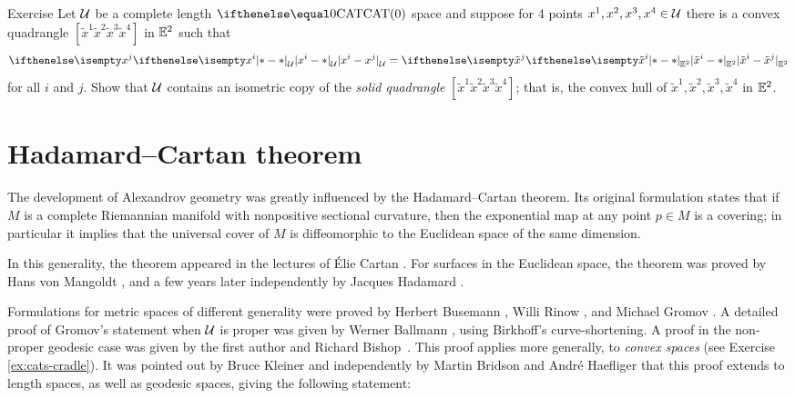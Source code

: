 \begin{thm}{Exercise}\label{ex:square}
Let $\mathcal{U}$ be a complete length $\CAT0$ space and 
suppose 
for 4 points $x^1,x^2,x^3,x^4\in \spc{U}$
there is a convex quadrangle
$[\tilde x^1\tilde x^2\tilde x^3\tilde x^4]$
in $\mathbb{E}^2$
such that 
\[\dist{x^i}{x^j}{\spc{U}}=\dist{\tilde x^i}{\tilde x^j}{\EE^2}\]
for all $i$ and $j$.
Show that $\mathcal{U}$ contains an isometric copy of the 
\emph{solid quadrangle}
$[\tilde x^1\tilde x^2\tilde x^3\tilde x^4]$; that is, the convex hull of $\tilde x^1,\tilde x^2,\tilde x^3,\tilde x^4$ in $\mathbb{E}^2$.
\end{thm}


\section{Hadamard--Cartan theorem}\label{sec:Hadamard--Cartan}

The development of Alexandrov geometry was greatly influenced by the Hadamard--Cartan theorem.
Its original formulation states that if $M$ is a complete Riemannian manifold with nonpositive sectional curvature, 
then the exponential map at any point $p\in M$ is a covering;
in particular it implies that the universal cover of $M$ is diffeomorphic to the Euclidean space of the same dimension.

In this generality, the theorem appeared in the lectures of \'Elie Cartan \cite{cartan}.
For surfaces in the Euclidean space, 
the theorem was proved by
Hans von Mangoldt \cite{mangoldt},  
and a few years later independently by Jacques Hadamard \cite{hadamard}.

Formulations for metric spaces of different generality were proved by 
Herbert Busemann \cite{busemann-CBA},
Willi Rinow \cite{rinow}, and 
Michael Gromov \cite[p.~119]{gromov:hyp-groups}. 
A detailed proof of Gromov's statement when $\mathcal{U}$ is proper  was given by Werner Ballmann \cite{ballmann:cartan-hadamard}, using Birkhoff's curve-shortening.  
A proof in the non-proper 
geodesic case 
was given by the first author and Richard Bishop~\cite{alexander-bishop:h-c}.  
This proof applies more generally, to {}\emph{convex spaces} (see Exercise \ref{ex:cats-cradle}).
It was pointed out by Bruce Kleiner \cite{ballmann:lectures} 
and independently by Martin Bridson and Andr\'{e} Haefliger \cite{bridson-haefliger} that 
this proof extends to length spaces, as well as geodesic spaces, giving the following statement:

